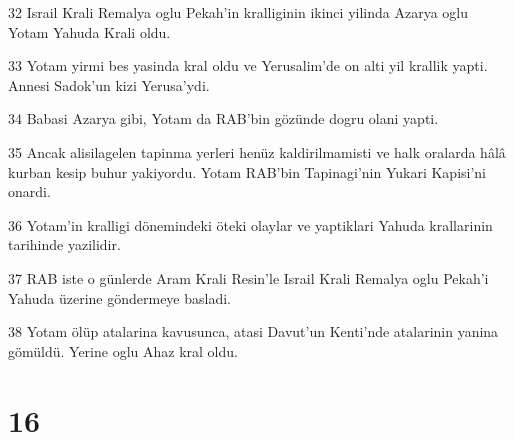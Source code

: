 \par 32 Israil Krali Remalya oglu Pekah'in kralliginin ikinci yilinda Azarya oglu Yotam Yahuda Krali oldu.
\par 33 Yotam yirmi bes yasinda kral oldu ve Yerusalim'de on alti yil krallik yapti. Annesi Sadok'un kizi Yerusa'ydi.
\par 34 Babasi Azarya gibi, Yotam da RAB'bin gözünde dogru olani yapti.
\par 35 Ancak alisilagelen tapinma yerleri henüz kaldirilmamisti ve halk oralarda hâlâ kurban kesip buhur yakiyordu. Yotam RAB'bin Tapinagi'nin Yukari Kapisi'ni onardi.
\par 36 Yotam'in kralligi dönemindeki öteki olaylar ve yaptiklari Yahuda krallarinin tarihinde yazilidir.
\par 37 RAB iste o günlerde Aram Krali Resin'le Israil Krali Remalya oglu Pekah'i Yahuda üzerine göndermeye basladi.
\par 38 Yotam ölüp atalarina kavusunca, atasi Davut'un Kenti'nde atalarinin yanina gömüldü. Yerine oglu Ahaz kral oldu.

\chapter{16}

